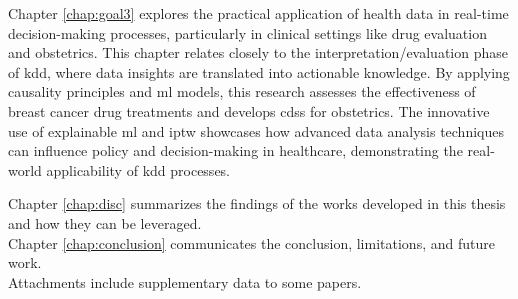 Chapter \ref{chap:goal3} explores the practical application of health data in real-time decision-making processes, particularly in clinical settings like drug evaluation and obstetrics. This chapter relates closely to the interpretation/evaluation phase of \ac{kdd}, where data insights are translated into actionable knowledge. By applying causality principles and \acl{ml} models, this research assesses the effectiveness of breast cancer drug treatments and develops \ac{cdss} for obstetrics. The innovative use of explainable \ac{ml} and \ac{iptw} showcases how advanced data analysis techniques can influence policy and decision-making in healthcare, demonstrating the real-world applicability of \ac{kdd} processes.


Chapter \ref{chap:disc} summarizes the findings of the works developed in this thesis and how they can be leveraged. \\

Chapter \ref{chap:conclusion} communicates the conclusion, limitations, and future work.\\

Attachments include supplementary data to some papers.

